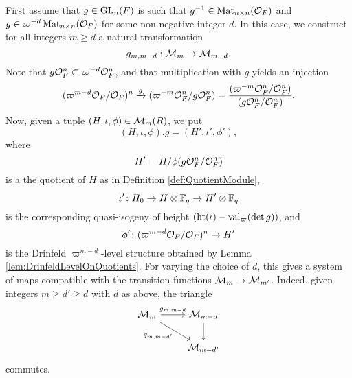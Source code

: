 \documentclass[../main.tex]{subfiles}
\begin{document}
First assume that $g \in \operatorname{GL}_n(F)$ is such that $g^{-1} \in \operatorname{Mat}_{n\times
n}(\mathcal{O}_F)$ and $g \in \varpi^{-d} \operatorname{Mat}_{n \times n}(\mathcal{O}_F)$ for some non-negative
integer $d$. In this case, we construct for all integers $m \geq d$ a natural
transformation
\begin{equation*}
  g_{m, m-d}: \mathcal{M}_m \to \mathcal{M}_{m-d}.
\end{equation*}
Note that $g \mathcal{O}_F^n \subset \varpi^{-d} \mathcal{O}_F^n$, and that multiplication with
$g$ yields an injection
\begin{equation*}
  (\varpi^{m-d}\mathcal{O}_F/\mathcal{O}_F)^n \xrightarrow{g} (\varpi^{-m}\mathcal{O}_F^n/g\mathcal{O}_F^n) = 
  \frac{(\varpi^{-m} \mathcal{O}_F^n /\mathcal{O}_F^n)}{(g \mathcal{O}_F^n/\mathcal{O}_F^n)}.
\end{equation*}
Now, given a tuple $(H, \iota, \phi) \in \mathcal{M}_m(R)$, we put $$(H, \iota, \phi).g = (H', \iota', \phi'),$$ where 
$$H'= H/\phi(g\mathcal{O}_F^n/\mathcal{O}_F^n)$$ 
is a the quotient of $H$ as in Definition \ref{def:QuotientModule}, 
$$\iota'\colon H_0 \to H \otimes \overline {\mathbb{F}}_q \to H' \otimes \overline {\mathbb{F}}_q$$ 
is the corresponding quasi-isogeny of height 
$(\textnormal{ht}(\iota) - \mathrm{val}_\varpi( \det g))$, and 
$$\phi'\colon (\varpi^{m-d}\mathcal{O}_F/\mathcal{O}_F)^n \to H'$$ 
is the Drinfeld $\varpi^{m-d}$-level structure obtained by Lemma
\ref{lem:DrinfeldLevelOnQuotients}. 
For varying the choice of $d$, this gives a system of maps compatible with the 
transition functions $\mathcal{M}_m \to \mathcal{M}_{m'}$. Indeed, given integers $m \geq d'
\geq d$ with $d$ as above, the triangle 
\begin{equation*}
\begin{tikzcd}[ampersand replacement=\&]
	{\cM_{m}} \& {\cM_{m-d}} \\
	\& {\cM_{m-d'}}
	\arrow["{g_{m,m-d}}", from=1-1, to=1-2]
	\arrow["{g_{m,m-d'}}"', from=1-1, to=2-2]
	\arrow[from=1-2, to=2-2]
\end{tikzcd}
\end{equation*}
commutes.
\end{document}
